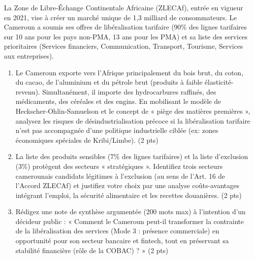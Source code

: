 \documentclass[11pt]{article}
\begin{document}
\begin{exercice}
La Zone de Libre-Échange Continentale Africaine (ZLECAf), entrée en vigueur en 2021, vise à créer un marché unique de 1,3 milliard de consommateurs. Le Cameroun a soumis ses offres de libéralisation tarifaire (90\% des lignes tarifaires sur 10 ans pour les pays non-PMA, 13 ans pour les PMA) et sa liste des services prioritaires (Services financiers, Communication, Transport, Tourisme, Services aux entreprises).
\begin{enumerate}
    \item Le Cameroun exporte vers l'Afrique principalement du bois brut, du coton, du cacao, de l'aluminium et du pétrole brut (produits à faible élasticité-revenu). Simultanément, il importe des hydrocarbures raffinés, des médicaments, des céréales et des engins. En mobilisant le modèle de Heckscher-Ohlin-Samuelson et le concept de « piège des matières premières », analysez les risques de désindustrialisation précoce si la libéralisation tarifaire n'est pas accompagnée d'une politique industrielle ciblée (ex: zones économiques spéciales de Kribi/Limbe). (2 pts)
    \item La liste des produits sensibles (7\% des lignes tarifaires) et la liste d'exclusion (3\%) protègent des secteurs « stratégiques ». Identifiez trois secteurs camerounais candidats légitimes à l'exclusion (au sens de l'Art. 16 de l'Accord ZLECAf) et justifiez votre choix par une analyse coûts-avantages intégrant l'emploi, la sécurité alimentaire et les recettes douanières. (2 pts)
    \item Rédigez une note de synthèse argumentée (200 mots max) à l'intention d'un décideur public : « Comment le Cameroun peut-il transformer la contrainte de la libéralisation des services (Mode 3 : présence commerciale) en opportunité pour son secteur bancaire et fintech, tout en préservant sa stabilité financière (rôle de la COBAC) ? » (2 pts)
\end{enumerate}
\end{exercice}
\end{document}
